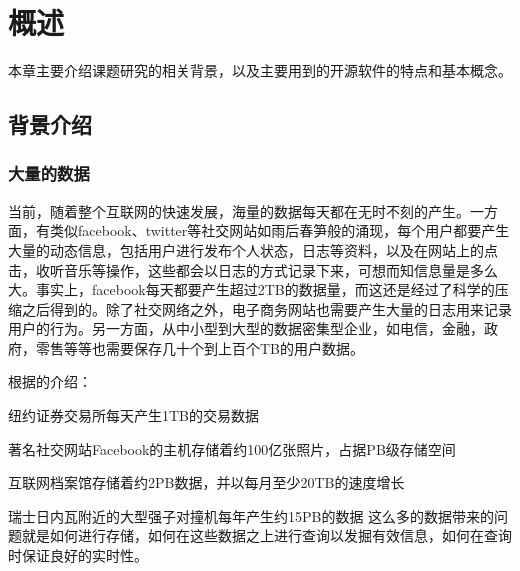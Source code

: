 \chapter{概述}
本章主要介绍课题研究的相关背景，以及主要用到的开源软件的特点和基本概念。
\section{背景介绍}

\subsection{大量的数据}
  当前，随着整个互联网的快速发展，海量的数据每天都在无时不刻的产生。一方面，有类似facebook、twitter等社交网站如雨后春笋般的涌现，每个用户都要产生大量的动态信息，包括用户进行发布个人状态，日志等资料，以及在网站上的点击，收听音乐等操作，这些都会以日志的方式记录下来，可想而知信息量是多么大。事实上，facebook每天都要产生超过2TB的数据量，而这还是经过了科学的压缩之后得到的。除了社交网络之外，电子商务网站也需要产生大量的日志用来记录用户的行为。另一方面，从中小型到大型的数据密集型企业，如电信，金融，政府，零售等等也需要保存几十个到上百个TB的用户数据。


根据\cite{HadoopGuide}的介绍：
\begin{compactitem}
\item 纽约证券交易所每天产生1TB的交易数据
\item 著名社交网站Facebook的主机存储着约100亿张照片，占据PB级存储空间
\item 互联网档案馆存储着约2PB数据，并以每月至少20TB的速度增长
\item 瑞士日内瓦附近的大型强子对撞机每年产生约15PB的数据
这么多的数据带来的问题就是如何进行存储，如何在这些数据之上进行查询以发掘有效信息，如何在查询时保证良好的实时性。
\end{compactitem}


